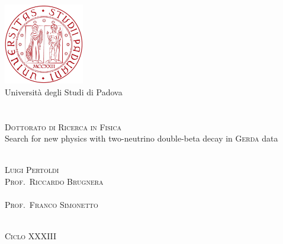 
\begin{titlepage}
  \thispagestyle{empty}
  \begin{center}
  \includegraphics[width=3.5cm]{img/unipd-logo.pdf} \\
  \vspace{0.5cm}
  {\Large Universit\`a degli Studi di Padova} \\
  \hrulefill \\
   \\
  \vspace{2cm}
  \textsc{\large Dottorato di Ricerca in Fisica} \\
  \vspace{3cm}
  \Huge{%
    Search for new physics with two-neutrino double-beta decay in \textsc{Gerda} data
  }
  \end{center}
  \vspace{3cm}
  \begin{multicols}{2}
  \large
  \noindent
   \\
  \textsc{Luigi Pertoldi}
  \columnbreak
  \flushright
   \\
  \textsc{Prof.~Riccardo Brugnera} \\
  \vspace{12mm}
   \\
  \textsc{Prof.~Franco Simonetto}
  \end{multicols}
  \vspace*{\fill}
  \begin{center}
  \hrulefill \\
  \textsc{Ciclo XXXIII}
  \end{center}
\end{titlepage}
\restoregeometry
